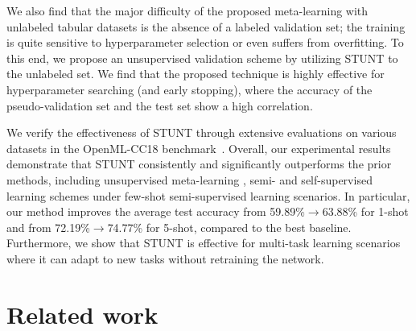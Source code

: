 We also find that the major difficulty of the proposed meta-learning with unlabeled tabular datasets is the absence of a labeled validation set; the training is quite sensitive to hyperparameter selection or even suffers from overfitting. To this end, we propose an unsupervised validation scheme by utilizing STUNT to the unlabeled set. We find that the proposed technique is highly effective for hyperparameter searching (and early stopping), where the accuracy of the pseudo-validation set and the test set show a high correlation.

We verify the effectiveness of STUNT through extensive evaluations on various datasets in the OpenML-CC18 benchmark~\citep{vanschoren2014openml, bishcl2018openml}. Overall, our experimental results demonstrate that STUNT consistently and significantly outperforms the prior methods, including unsupervised meta-learning \citep{hsu2018cactus}, semi- and self-supervised learning schemes \citep{tarvainen2017meanteacher,yoon2020vime,ucar2021subtab} under few-shot semi-supervised learning scenarios. In particular, our method improves the average test accuracy from 59.89\%$\rightarrow$63.88\% for 1-shot and from 72.19\%$\rightarrow$74.77\% for 5-shot, compared to the best baseline. Furthermore, we show that STUNT is effective for multi-task learning scenarios where it can adapt to new tasks without retraining the network.

\section{Related work}
\label{sec:related}

